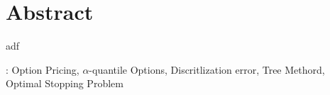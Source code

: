 \chapter{Abstract}

adf 
\vspace{1cm}

: Option Pricing, $\alpha$-quantile Options, Discritlization error, Tree Methord, Optimal Stopping Problem
